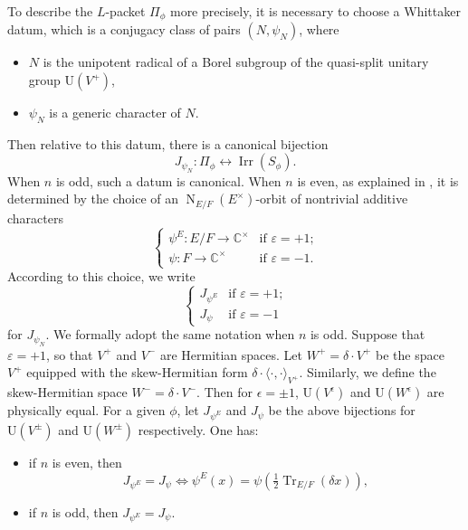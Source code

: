 \documentclass[11pt]{amsart}
\numberwithin{equation}{section}
\theoremstyle{plain}
\theoremstyle{definition}
\theoremstyle{remark}
\def\Irr{\operatorname{Irr}}
\def\N{\operatorname{N}}
\def\Tr{\operatorname{Tr}}
\def\U{\mathrm{U}}
\def\CC{\mathbb{C}}
\begin{document}
To describe the $L$-packet $\Pi_{\phi}$ more precisely, it is necessary to choose a Whittaker datum, which is a conjugacy class of pairs $(N, \psi_N)$, where
\begin{itemize}
\item $N$ is the unipotent radical of a Borel subgroup of the quasi-split unitary group $\U(V^+)$,
\item $\psi_N$ is a generic character of $N$.
\end{itemize}
Then relative to this datum, there is a canonical bijection
\[  J_{\psi_N}:   \Pi_{\phi}  \longleftrightarrow \Irr( S_{\phi}). \]
When $n$ is odd, such a datum is canonical.
When $n$ is even, as explained in \cite[\S 12]{ggp1}, it is determined by the choice of an $\N_{E/F}(E^{\times})$-orbit of nontrivial additive characters
\[
\begin{cases}
 \psi^E:E/F \rightarrow \CC^{\times} & \text{if $\varepsilon = +1$;} \\
 \psi:F \rightarrow \CC^{\times} & \text{if $\varepsilon = -1$.}
\end{cases}
\]
According to this choice, we write
\[
\begin{cases}
 J_{\psi^E} & \text{if $\varepsilon = +1$;} \\
 J_{\psi} & \text{if $\varepsilon = -1$}
\end{cases} 
\]
for $J_{\psi_N}$.
We formally adopt the same notation when $n$ is odd.
Suppose that $\varepsilon = +1$, so that $V^+$ and $V^-$ are Hermitian spaces.
Let $W^+ = \delta \cdot V^+$ be the space $V^+$ equipped with the skew-Hermitian form $\delta \cdot \langle \cdot, \cdot \rangle_{V^+}$.
Similarly, we define the skew-Hermitian space $W^- = \delta \cdot V^-$.
Then for $\epsilon = \pm 1$, $\U(V^\epsilon)$ and $\U(W^\epsilon)$ are physically equal.
For a given $\phi$, let $J_{\psi^E}$ and $J_{\psi}$ be the above bijections for $\U(V^{\pm})$ and $\U(W^{\pm})$ respectively.
One has:
\begin{itemize}
\item if $n$ is even, then
\[
 J_{\psi^E}  =  J_{\psi} \Longleftrightarrow \psi^E(x)  = \psi( \tfrac{1}{2}  \Tr_{E/F}(\delta x)), 
\]
\item if $n$ is odd, then $J_{\psi^E}  = J_{\psi}$. 
\end{itemize}
\end{document}
